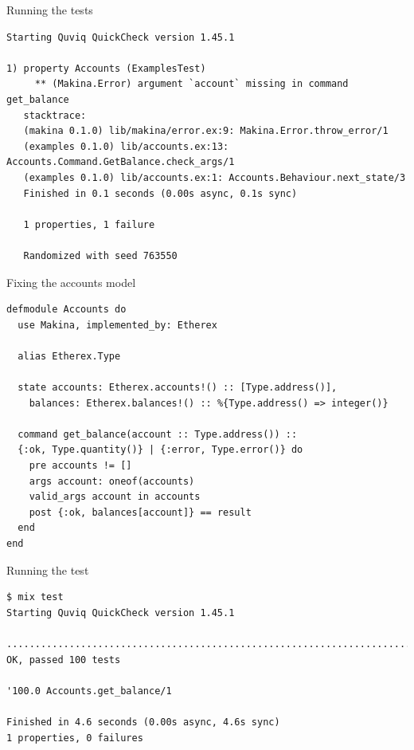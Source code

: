 \documentclass[aspectratio=169, 10pt]{beamer}
\begin{document}
\begin{frame}[label={sec:org16a71ae},fragile]{Running the tests}
 \lstset{language=shell,label= ,caption= ,captionpos=b,numbers=none,style=display}
\begin{lstlisting}
Starting Quviq QuickCheck version 1.45.1

1) property Accounts (ExamplesTest)
     ** (Makina.Error) argument `account` missing in command get_balance
   stacktrace:
   (makina 0.1.0) lib/makina/error.ex:9: Makina.Error.throw_error/1
   (examples 0.1.0) lib/accounts.ex:13: Accounts.Command.GetBalance.check_args/1
   (examples 0.1.0) lib/accounts.ex:1: Accounts.Behaviour.next_state/3
   Finished in 0.1 seconds (0.00s async, 0.1s sync)

   1 properties, 1 failure

   Randomized with seed 763550
\end{lstlisting}
\end{frame}


\begin{frame}[label={sec:org28105b4},fragile]{Fixing the accounts model}
 \lstset{language=elixir,label= ,caption= ,captionpos=b,numbers=none,style=display}
\begin{lstlisting}
defmodule Accounts do
  use Makina, implemented_by: Etherex

  alias Etherex.Type

  state accounts: Etherex.accounts!() :: [Type.address()],
    balances: Etherex.balances!() :: %{Type.address() => integer()}

  command get_balance(account :: Type.address()) ::
  {:ok, Type.quantity()} | {:error, Type.error()} do
    pre accounts != []
    args account: oneof(accounts)
    valid_args account in accounts
    post {:ok, balances[account]} == result
  end
end
\end{lstlisting}
\end{frame}


\begin{frame}[label={sec:orgb67cb52},fragile]{Running the test}
 \lstset{language=shell,label= ,caption= ,captionpos=b,numbers=none,style=display}
\begin{lstlisting}
$ mix test
Starting Quviq QuickCheck version 1.45.1

....................................................................................................
OK, passed 100 tests

'100.0 Accounts.get_balance/1

Finished in 4.6 seconds (0.00s async, 4.6s sync)
1 properties, 0 failures
\end{lstlisting}
\end{frame}
\end{document}
